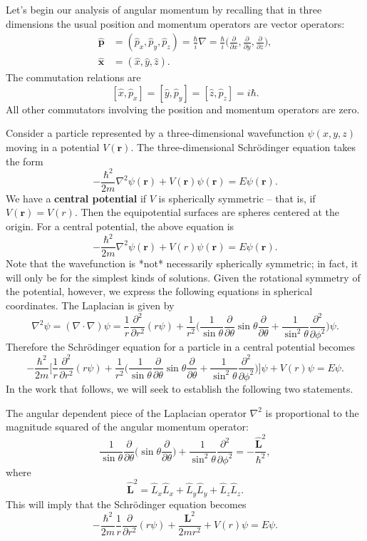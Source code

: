 Let's begin our analysis of angular momentum by recalling that in three dimensions the usual position and momentum operators are vector operators: \begin{align*}\hat{\mathbf{p}}&= (\hat{p}_x,\hat{p}_y,\hat{p}_z)=\frac{\hbar}{i}\nabla=\frac{\hbar}{i}\bigg(\frac{\partial}{\partial x},\frac{\partial}{\partial y},\frac{\partial}{\partial z}\bigg),\\\hat{\mathbf{x}}&=(\hat{x},\hat{y},\hat{z}).\end{align*}The commutation relations are $$[\hat{x},\hat{p}_x]= [\hat{y},\hat{p}_y]=[\hat{z},\hat{p}_z]=i\hbar.$$All other commutators involving the position and momentum operators are zero.

Consider a particle represented by a three-dimensional wavefunction $\psi(x,y,z)$ moving in a potential $V(\mathbf{r})$. The three-dimensional Schrödinger equation takes the form $$-\frac{\hbar^2}{2m}\nabla^2\psi(\mathbf{r})+V(\mathbf{r})\psi(\mathbf{r})=E\psi(\mathbf{r}).$$We have a \textbf{central potential} if $V$ is spherically symmetric -- that is, if $V(\mathbf{r})=V(r)$. Then the equipotential surfaces are spheres centered at the origin. For a central potential, the above equation is $$-\frac{\hbar^2}{2m}\nabla^2\psi(\mathbf{r})+V(r)\psi(\mathbf{r})=E\psi(\mathbf{r}).$$Note that the wavefunction is *not* necessarily spherically symmetric; in fact, it will only be for the simplest kinds of solutions. Given the rotational symmetry of the potential, however, we express the following equations in spherical coordinates. The Laplacian is given by $$\nabla^2\psi=(\nabla\cdot\nabla)\psi=\frac{1}{r}\frac{\partial^2}{\partial r^2}(r\psi)+\frac{1}{r^2}\bigg(\frac{1}{\sin\theta}\frac{\partial}{\partial\theta}\sin\theta\frac{\partial}{\partial\theta}+\frac{1}{\sin^2\theta}\frac{\partial^2}{\partial\phi^2}\bigg)\psi.$$Therefore the Schrödinger equation for a particle in a central potential becomes $$-\frac{\hbar^2}{2m}\bigg[\frac{1}{r}\frac{\partial^2}{\partial r^2}(r\psi)+\frac{1}{r^2}\bigg(\frac{1}{\sin\theta}\frac{\partial}{\partial\theta}\sin\theta\frac{\partial}{\partial\theta}+\frac{1}{\sin^2\theta}\frac{\partial^2}{\partial\phi^2}\bigg)\bigg]\psi+V(r)\psi=E\psi.$$In the work that follows, we will seek to establish the following two statements.
\begin{framedprop}\label{12.1}
    The angular dependent piece of the Laplacian operator $\nabla^2$ is proportional to the magnitude squared of the angular momentum operator: $$\frac{1}{\sin\theta}\frac{\partial}{\partial\theta}\bigg(\sin\theta\frac{\partial}{\partial\theta}\bigg)+\frac{1}{\sin^2\theta}\frac{\partial^2}{\partial\phi^2}=-\frac{\hat{\mathbf{L}}^2}{\hbar^2},$$where $$\hat{\mathbf{L}}^2=\hat{L}_x\hat{L}_x+\hat{L}_y\hat{L}_y+\hat{L}_z\hat{L}_z.$$This will imply that the Schrödinger equation becomes $$-\frac{\hbar^2}{2m}\frac{1}{r}\frac{\partial}{\partial r^2}(r\psi)+\frac{\mathbf{L}^2}{2mr^2}+V(r)\psi=E\psi.$$
\end{framedprop}
